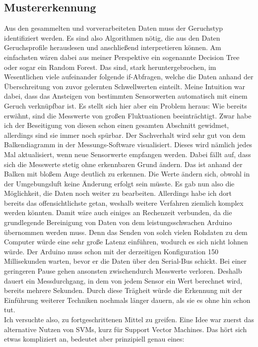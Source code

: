 \documentclass[10pt]{article}
\begin{document}
\subsection{Mustererkennung}
Aus den gesammelten und vorverarbeiteten Daten muss der Geruchstyp identifiziert werden. Es sind also Algorithmen nötig, die aus den Daten
Geruchsprofile herauslesen und anschließend interpretieren können. Am einfachsten wären dabei aus meiner Perspektive ein sogenannte Decision Tree oder sogar ein Random Forest. 
Das sind, stark heruntergebrochen, im Wesentlichen viele aufeinander folgende if-Abfragen, welche die Daten anhand der Überschreitung von zuvor gelernten Schwellwerten einteilt. 
Meine Intuition war dabei, dass das Ansteigen von bestimmten Sensorwerten automatisch mit einem Geruch verknüpfbar ist. Es stellt sich hier aber ein Problem heraus: Wie bereits erwähnt, 
sind die Messwerte von großen Fluktuationen beeinträchtigt. Zwar habe ich der Beseitigung von diesen schon einen gesamten Abschnitt gewidmet, allerdings sind sie immer noch spürbar.
Der Sachverhalt wird sehr gut von dem Balkendiagramm in der Messungs-Software visualisiert. Dieses wird nämlich jedes Mal aktualisiert, wenn neue Sensorwerte empfangen werden.
Dabei fällt auf, dass sich die Messwerte stetig ohne erkennbaren Grund ändern. Das ist anhand der Balken mit bloßem Auge deutlich zu erkennen. Die Werte ändern sich, obwohl in der Umgebungsluft
keine Änderung erfolgt sein müsste. Es gab nun also die Möglichkeit, die Daten noch weiter zu bearbeiten. Allerdings habe ich dort bereits das offensichtlichste getan,
weshalb weitere Verfahren ziemlich komplex werden könnten. Damit wäre auch einiges an Rechenzeit verbunden, da die grundlegende Bereinigung von Daten von dem leistungsschwachen
Arduino übernommen werden muss. Denn das Senden von solch vielen Rohdaten zu dem Computer würde eine sehr große Latenz einführen, wodurch es sich nicht lohnen würde.
Der Arduino muss schon mit der derzeitigen Konfiguration 150 Millisekunden warten, bevor er die Daten über den Serial-Bus schickt. Bei einer geringeren Pause gehen 
ansonsten zwischendurch Messwerte verloren. Deshalb dauert ein Messdurchgang,
in dem von jedem Sensor ein Wert berechnet wird, bereits mehrere Sekunden. Durch diese Trägheit würde die Erkennung mit der Einführung weiterer
Techniken nochmals länger dauern, als sie es ohne hin schon tut.\\
Ich versuchte also, zu fortgeschrittenen Mittel zu greifen. Eine Idee war zuerst das alternative Nutzen von SVMs, kurz für Support Vector Machines.
Das hört sich etwas kompliziert an, bedeutet aber prinzipiell genau eines:
\end{document}
